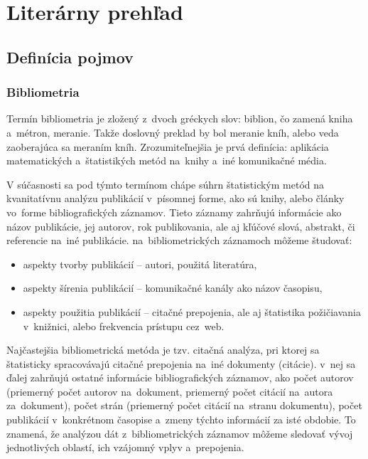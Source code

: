 \chapter{Literárny prehľad}
\setcounter{page}{1}

\section{Definícia pojmov}

\subsection{Bibliometria}

Termín bibliometria je zložený z~dvoch gréckych slov: biblion, čo zamená kniha
a~métron, meranie. Takže doslovný preklad by bol meranie kníh, alebo veda
zaoberajúca sa meraním kníh. Zrozumiteľnejšia je prvá definícia: aplikácia
matematických a~štatistikých metód na~knihy a~iné komunikačné média.\citet{Pritchard1969} 

V súčasnosti sa pod týmto termínom chápe súhrn štatistickým metód na
kvanitatívnu analýzu publikácií v~písomnej forme, ako sú knihy, alebo články
vo~forme bibliografických záznamov. Tieto záznamy zahrňujú informácie ako názov
publikácie, jej autorov, rok publikovania, ale aj kľúčové slová, abstrakt, či
referencie na~iné publikácie. na~bibliometrických záznamoch môžeme študovať:

\begin{itemize}
\item aspekty tvorby publikácií -- autori, použitá literatúra,
\item aspekty šírenia publikácií -- komunikačné kanály ako názov časopisu,
\item aspekty použitia publikácií -- citačné prepojenia, ale aj štatistika
  požičiavania v~knižnici, alebo frekvencia prístupu cez~web. \citet{Ondrisova2011}
\end{itemize}

Najčastejšia bibliometrická metóda je tzv. citačná analýza, pri ktorej sa
štatisticky spracovávajú citačné prepojenia na~iné dokumenty (citácie). v~nej sa
ďalej zahrňujú ostatné informácie bibliografických záznamov, ako počet autorov
(priemerný počet autorov na~dokument, priemerný počet citácií na~autora
za~dokument), počet strán (priemerný počet citácií na~stranu dokumentu), počet
publikácií v~konkrétnom časopise a~zmeny týchto informácií za isté obdobie. To
znamená, že analýzou dát z~bibliometrických záznamov môžeme sledovať vývoj
jednotlivých oblastí, ich vzájomný vplyv a~prepojenia.

